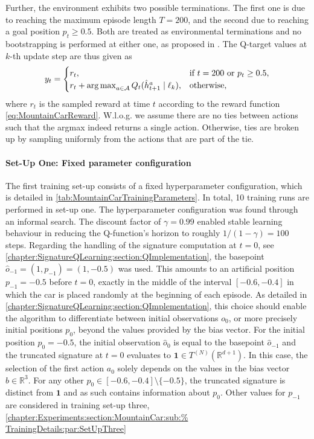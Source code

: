 \documentclass[
    a4paper,
    11pt,
    bibliography=totoc,
    listof=totoc,      
    headinclude=true,
    cleardoublepage=empty,
]{scrbook}
\theoremstyle{plain}
\theoremstyle{definition}
\theoremstyle{remark}
\newcommand{\SetR}{\mathbb R}
\newcommand{\SpaceA}{{\cal A}}
\DeclareMathOperator*{\argmax}{arg\,max}
\begin{document}
Further, the environment exhibits two possible terminations. The first one is
due to reaching the maximum episode length $T=200$, and the second due to
reaching a goal position $p_t\geq 0.5$. Both are treated as environmental
terminations and no bootstrapping is performed at either one, as proposed in
\cite{pardo2018_tlrl}. The Q-target values at $k$-th update step are thus
given as
\[
    y_t = \begin{cases}
        r_t, & \mbox{if } t=200 \mbox{ or } p_t\geq 0.5, \\
        r_t + \argmax_{a\in\SpaceA} Q_t(\hat{h}^a_{t+1}\mid \ell_k), 
            & \mbox{otherwise,}
    \end{cases}
\]
where $r_t$ is the sampled reward at time $t$ according to the reward function 
\eqref{eq:MountainCarReward}. W.l.o.g. we assume there are no ties between
actions such that the argmax indeed returns a single action. Otherwise, ties
are broken up by sampling uniformly from the actions that are part of the tie. 

\paragraph{Set-Up One: Fixed parameter configuration} 
\label{chapter:Experiments:section:MountainCar:sub:TrainingDetails:par:SetUpOne}

The first training set-up consists of a fixed hyperparameter configuration,
which is detailed in \cref{tab:MountainCarTrainingParameters}. In total, 10
training runs are performed in set-up one. The hyperparameter configuration
was found through an informal search. The discount factor of $\gamma=0.99$
enabled stable learning behaviour in reducing the Q-function's horizon to
roughly $1/(1-\gamma) = 100$ steps. Regarding the handling of the signature
computation at $t=0$, see
\cref{chapter:SignatureQLearning:section:QImplementation}, the basepoint 
$\hat{o}_{-1} = (1, p_{-1}) = (1, -0.5)$ was used. This amounts to an
artificial position $p_{-1}=-0.5$ before $t=0$, exactly in the middle of the
interval $[-0.6, -0.4]$ in which the car is placed randomly at the beginning
of each episode. As detailed in
\cref{chapter:SignatureQLearning:section:QImplementation}, this choice should
enable the algorithm to differentiate between initial observations $o_0$, or
more precisely initial positions $p_0$, beyond the values provided by the bias
vector. For the initial position $p_0 = -0.5$, the initial observation 
$\hat{o}_0$ is equal to the basepoint $\hat{o}_{-1}$ and the truncated
signature at $t=0$ evaluates to $\bm 1 \in T^{(N)}(\SetR^{d+1})$. In this
case, the selection of the first action $a_0$ solely depends on the values in
the bias vector $b\in\SetR^3$. For any other $p_0\in[-0.6, -0.4] \setminus \{-0.5\}$,
the truncated signature is distinct from $\bm 1$ and as such contains
information about $p_0$. Other values for $p_{-1}$ are considered in training
set-up three, \cref{chapter:Experiments:section:MountainCar:sub:%
TrainingDetails:par:SetUpThree}
\end{document}

